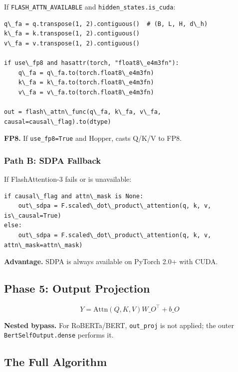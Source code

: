 If \texttt{FLASH\_ATTN\_AVAILABLE} and \texttt{hidden\_states.is\_cuda}:

\begin{lstlisting}
q\_fa = q.transpose(1, 2).contiguous()  # (B, L, H, d\_h)
k\_fa = k.transpose(1, 2).contiguous()
v\_fa = v.transpose(1, 2).contiguous()

if use\_fp8 and hasattr(torch, "float8\_e4m3fn"):
    q\_fa = q\_fa.to(torch.float8\_e4m3fn)
    k\_fa = k\_fa.to(torch.float8\_e4m3fn)
    v\_fa = v\_fa.to(torch.float8\_e4m3fn)

out = flash\_attn\_func(q\_fa, k\_fa, v\_fa, causal=causal\_flag).to(dtype)
\end{lstlisting}

\textbf{FP8.} If \texttt{use\_fp8=True} and Hopper, casts Q/K/V to FP8.

\subsubsection{Path B: SDPA Fallback}

If FlashAttention-3 fails or is unavailable:

\begin{lstlisting}
if causal\_flag and attn\_mask is None:
    out\_sdpa = F.scaled\_dot\_product\_attention(q, k, v, is\_causal=True)
else:
    out\_sdpa = F.scaled\_dot\_product\_attention(q, k, v, attn\_mask=attn\_mask)
\end{lstlisting}

\textbf{Advantage.} SDPA is always available on PyTorch 2.0+ with CUDA.

\subsection{Phase 5: Output Projection}

\[
Y = \text{Attn}(Q, K, V) W\_O^\top + b\_O
\tag{4.4}
\]

\textbf{Nested bypass.} For RoBERTa/BERT, \texttt{out\_proj} is not applied; the outer 
\texttt{BertSelfOutput.dense} performs it.

\subsection{The Full Algorithm}

